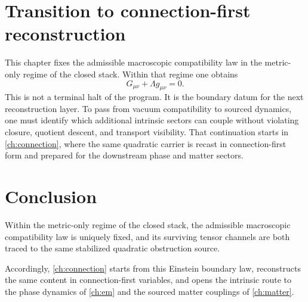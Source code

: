 \section{Transition to connection-first reconstruction}
\label{sec:einstein-transition}
This chapter fixes the admissible macroscopic compatibility law in the
metric-only regime of the closed stack.
Within that regime one obtains
\[
	G_{\mu\nu}+\Lambda g_{\mu\nu}=0.
\]
This is not a terminal halt of the program.
It is the boundary datum for the next reconstruction layer.
To pass from vacuum compatibility to sourced dynamics, one must identify
which additional intrinsic sectors can couple without violating closure,
quotient descent, and transport visibility.
That continuation starts in \cref{ch:connection}, where the same
quadratic carrier is recast in connection-first form and prepared for the
downstream phase and matter sectors.

\section{Conclusion}
\label{sec:einstein-conclusion}
Within the metric-only regime of the closed stack, the admissible
macroscopic compatibility law is uniquely fixed, and its surviving tensor
channels are both traced to the same stabilized quadratic obstruction
source.

Accordingly, \cref{ch:connection} starts from this Einstein boundary law,
reconstructs the same content in connection-first variables, and opens
the intrinsic route to the phase dynamics of \cref{ch:em} and the sourced
matter couplings of \cref{ch:matter}.